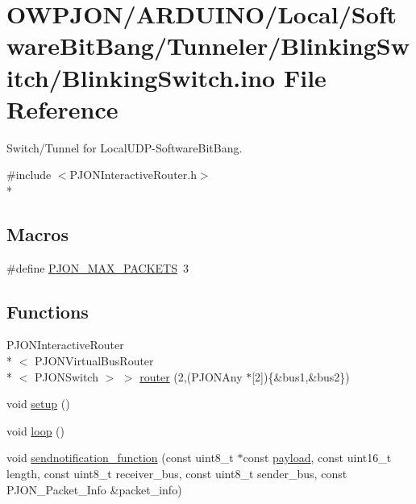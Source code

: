 \hypertarget{BlinkingSwitch_8ino}{\section{O\-W\-P\-J\-O\-N/\-A\-R\-D\-U\-I\-N\-O/\-Local/\-Software\-Bit\-Bang/\-Tunneler/\-Blinking\-Switch/\-Blinking\-Switch.ino File Reference}
\label{BlinkingSwitch_8ino}
}


Switch/\-Tunnel for Local\-U\-D\-P-\/\-Software\-Bit\-Bang.  


{\ttfamily \#include $<$P\-J\-O\-N\-Interactive\-Router.\-h$>$}\\*
\subsection*{Macros}
\begin{DoxyCompactItemize}
\item 
\#define \hyperlink{BlinkingSwitch_8ino_af093da5eac99580be6ba61b4dc79f2c1}{P\-J\-O\-N\-\_\-\-M\-A\-X\-\_\-\-P\-A\-C\-K\-E\-T\-S}~3
\end{DoxyCompactItemize}
\subsection*{Functions}
\begin{DoxyCompactItemize}
\item 
P\-J\-O\-N\-Interactive\-Router\\*
$<$ P\-J\-O\-N\-Virtual\-Bus\-Router\\*
$<$ P\-J\-O\-N\-Switch $>$ $>$ \hyperlink{BlinkingSwitch_8ino_a8c8a35b003b9467f7f3b1a828c90a5b5}{router} (2,(P\-J\-O\-N\-Any $\ast$\mbox{[}2\mbox{]})\{\&bus1,\&bus2\})
\item 
void \hyperlink{BlinkingSwitch_8ino_a4fc01d736fe50cf5b977f755b675f11d}{setup} ()
\item 
void \hyperlink{BlinkingSwitch_8ino_afe461d27b9c48d5921c00d521181f12f}{loop} ()
\item 
void \hyperlink{BlinkingSwitch_8ino_af488e931618139cd40b126dabfe9b6bb}{sendnotification\-\_\-function} (const uint8\-\_\-t $\ast$const \hyperlink{Uno__Dragino__LoRa__GPS__Shield__TTN_8ino_a78a402d1762842473567de90b11ed256}{payload}, const uint16\-\_\-t length, const uint8\-\_\-t receiver\-\_\-bus, const uint8\-\_\-t sender\-\_\-bus, const P\-J\-O\-N\-\_\-\-Packet\-\_\-\-Info \&packet\-\_\-info)
\end{DoxyCompactItemize}
